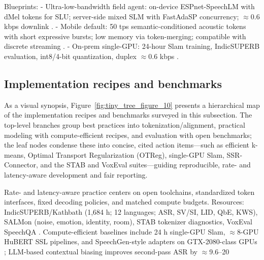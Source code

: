 \documentclass{article}
\begin{document}
Blueprints:
- Ultra-low-bandwidth field agent: on-device ESPnet-SpeechLM with dMel tokens for SLU; server-side mixed SLM with FastAdaSP concurrency; $\approx$0.6 kbps downlink \cite{bai2025dmelspeechtokenizationmadesimple,tian2025espnetspeechlmopenspeechlanguagemodeltoo,entry2025indicsuperbspeechprocessinguniversalperf,lu2024fastadaspmultitaskadaptedefficientinfere}.
- Mobile default: 50 tps semantic-conditioned acoustic tokens with short expressive bursts; low memory via token-merging; compatible with discrete streaming \cite{mousavi2024dasbdiscreteaudiospeechbenchmark,yang2025diffsoundstreamefficientspeechtokenizati,lu2024fastadaspmultitaskadaptedefficientinfere,zhao2024textlessstreamingspeechtranslationsemant}.
- On-prem single-GPU: 24-hour Slam training, IndicSUPERB evaluation, int8/4-bit quantization, duplex $\approx$0.6 kbps \cite{maimon2025slammingtrainingspeechlanguagemodelonegp,entry2025indicsuperbspeechprocessinguniversalperf,dao2025ichigomixedmodalearlyfusionrealtimevoice}.

\subsection{Implementation recipes and benchmarks} \label{subsec:implementationrecipesandbenchmarks}
As a visual synopsis, Figure~\ref{fig:tiny_tree_figure_10} presents a hierarchical map of the implementation recipes and benchmarks surveyed in this subsection. The top-level branches group best practices into tokenization/alignment, practical modeling with compute-efficient recipes, and evaluation with open benchmarks; the leaf nodes condense these into concise, cited action items---such as efficient k-means, Optimal Transport Regularization (OTReg), single-GPU Slam, SSR-Connector, and the STAB and VoxEval suites---guiding reproducible, rate- and latency-aware development and fair reporting.

Rate- and latency-aware practice centers on open toolchains, standardized token interfaces, fixed decoding policies, and matched compute budgets. Resources: IndicSUPERB/Kathbath (1,684 h; 12 languages; ASR, SV/SI, LID, QbE, KWS), SALMon (noise, emotion, identity, room), STAB tokenizer diagnostics, VoxEval SpeechQA \cite{entry2025indicsuperbspeechprocessinguniversalperf,maimon2025salmonsuiteacousticlanguagemodelevaluati,vashishth2024stabspeechtokenizerassessmentbenchmark,cui2025voxevalbenchmarkingknowledgeunderstandin}. Compute-efficient baselines include 24 h single-GPU Slam, $\approx$8-GPU HuBERT SSL pipelines, and SpeechGen-style adapters on GTX-2080-class GPUs \cite{maimon2025slammingtrainingspeechlanguagemodelonegp,chen2023reducingbarriersselfsupervisedlearninghu,wu2023speechgenunlockinggenerativepowerspeechl}; LLM-based contextual biasing improves second-pass ASR by $\approx$9.6--20%
\end{document}
